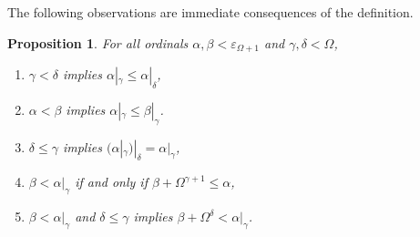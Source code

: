 \documentclass[UKenglish,cleveref,DIV=12]{scrartcl}
\newtheorem{proposition}[lemma]{Proposition}
\theoremstyle{definition}
\theoremstyle{definition}
\begin{document}
The following observations are immediate consequences of the definition.
\begin{proposition}\label{extprop:morditems} For all ordinals $\alpha, \beta<\varepsilon_{\Omega+1}$ and $\gamma,\delta<\Omega$,
\begin{enumerate}
  \item $\gamma<\delta$ implies $\alpha|_\gamma\le \alpha|_\delta$,
  \item $\alpha<\beta$ implies $\alpha|_\gamma\le \beta|_\gamma$.
  \item $\delta\le\gamma$ implies $(\alpha| _\gamma)|_\delta=\alpha|_\gamma$,
  \item $\beta<\alpha|_\gamma$ if and only if $\beta+\Omega^{\gamma+1}\le \alpha$,
  \item $\beta<\alpha|_\gamma$ and $\delta\le\gamma$ implies $\beta+\Omega^\delta<\alpha|_\gamma$.\label{extitem:morditem4}
\end{enumerate}
\end{proposition}
%
%
%
\end{document}
